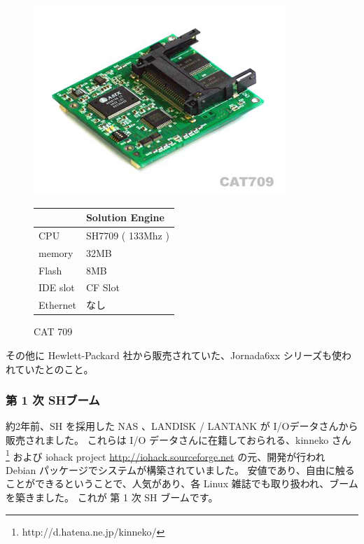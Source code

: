 \documentclass[mingoth,a4paper]{jsarticle}
\begin{document}
\begin{figure}[htbp]
 \begin{minipage}{0.5\hsize}
  \begin{center}
   \includegraphics[width=0.6\hsize]{image200705/cat709.jpg}
  \end{center}
  \caption{CAT 709}
 \end{minipage}
 \begin{minipage}{0.5\hsize}
  \begin{tabular}{|l|l|} \hline
   & Solution Engine \\ \hline
   CPU & SH7709 ( 133Mhz ) \\ \hline
   memory & 32MB\\ \hline
   Flash & 8MB \\ \hline 
   IDE slot & CF Slot \\ \hline
   Ethernet & なし\\ \hline
  \end{tabular}
 \end{minipage}
\end{figure}

その他に Hewlett-Packard 社から販売されていた、Jornada6xx シリーズも使われていたとのこと。


\subsubsection{第 1 次 SHブーム}

約2年前、SH を採用した NAS 、LANDISK / LANTANK  が I/Oデータさんから販売されました。
これらは I/O データさんに在籍しておられる、kinneko さん \footnote{http://d.hatena.ne.jp/kinneko/} および iohack project \url{http://iohack.sourceforge.net}
の元、開発が行われ Debian パッケージでシステムが構築されていました。
安値であり、自由に触ることができるということで、人気があり、各 Linux 雑誌でも取り扱われ、ブームを築きました。
これが 第 1 次 SH ブームです。
\end{document}
